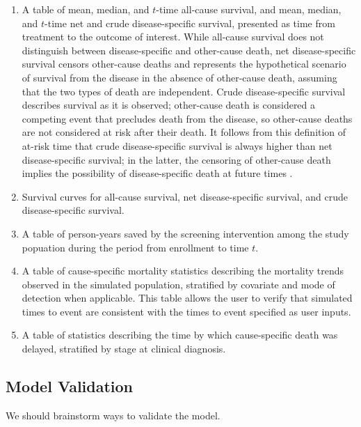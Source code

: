 \documentclass[11pt]{article}
\begin{document}
\begin{enumerate}
	\item A table of mean, median, and $t$-time all-cause survival, and mean, median, and $t$-time net and crude disease-specific survival, presented as time from treatment to the outcome of interest. 
        While all-cause survival does not distinguish between disease-specific and other-cause death, net disease-specific survival censors other-cause deaths and represents the hypothetical scenario of survival from the disease in the absence of other-cause death, assuming that the two types of death are independent. 
        Crude disease-specific survival describes survival as it is observed; other-cause death is considered a competing event that precludes death from the disease, so other-cause deaths are not considered at risk after their death. 
        It follows from this definition of at-risk time that crude disease-specific survival is always higher than net disease-specific survival; in the latter, the censoring of other-cause death implies the possibility of disease-specific death at future times \cite{kim_cumulative_2007}.
			
    \item Survival curves for all-cause survival, net disease-specific survival, and crude disease-specific survival.
			
    \item A table of person-years saved by the screening intervention among the study popuation during the period from enrollment to time $t$.

    \item A table of cause-specific mortality statistics describing the mortality trends observed in the simulated population, stratified by covariate and mode of detection when applicable. This table allows the user to verify that simulated times to event are consistent with the times to event specified as user inputs.

    \item A table of statistics describing the time by which cause-specific death was delayed, stratified by stage at clinical diagnosis.
\end{enumerate}

\subsection{Model Validation}
{\color{red} We should brainstorm ways to validate the model.}
\end{document}
